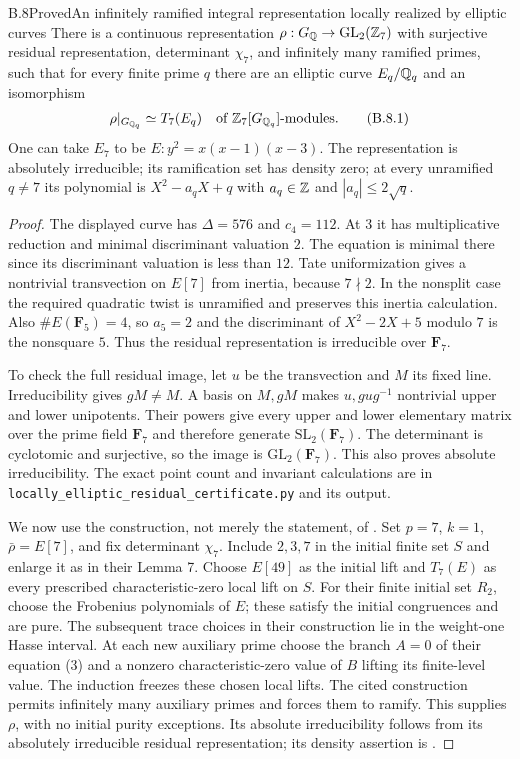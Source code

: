 \begin{statement}{B.8}{Proved}{An infinitely ramified integral representation locally realized by elliptic curves}
There is a continuous representation
$\rho:G_\mathbb Q\to\mathrm{GL}_2(\mathbb Z_7)$ with surjective residual
representation, determinant $\chi_7$, and infinitely many ramified
primes, such that for every finite prime $q$ there are an elliptic
curve $E_q/\mathbb Q_q$ and an isomorphism
\[
 \rho|_{G_{\mathbb Q_q}}\simeq T_7(E_q)
 \quad\text{of }\mathbb Z_7[G_{\mathbb Q_q}]\text{-modules}.      \tag{B.8.1}
\]
One can take $E_7$ to be $E:y^2=x(x-1)(x-3)$.  The representation
is absolutely irreducible; its ramification set has density zero;
at every unramified $q\ne7$ its polynomial is
$X^2-a_qX+q$ with $a_q\in\mathbb Z$ and $|a_q|\le2\sqrt q$.
\end{statement}
\begin{proof}
The displayed curve has $\Delta=576$ and $c_4=112$.  At $3$ it
has multiplicative reduction and minimal discriminant valuation $2$.
The equation is minimal there since its discriminant valuation is
less than $12$.  Tate uniformization gives a nontrivial transvection
on $E[7]$ from inertia, because $7\nmid2$.  In the nonsplit case
the required quadratic twist is unramified and preserves this inertia
calculation.  Also $\#E(\mathbf F_5)=4$, so $a_5=2$ and the
discriminant of $X^2-2X+5$ modulo $7$ is the nonsquare $5$.
Thus the residual representation is irreducible over $\mathbf F_7$.

To check the full residual image, let $u$ be the transvection and
$M$ its fixed line.  Irreducibility gives $gM\ne M$.  A basis on
$M,gM$ makes $u,gug^{-1}$ nontrivial upper and lower unipotents.
Their powers give every upper and lower elementary matrix over the
prime field $\mathbf F_7$ and therefore generate
$\mathrm{SL}_2(\mathbf F_7)$.  The determinant is cyclotomic and
surjective, so the image is $\mathrm{GL}_2(\mathbf F_7)$.
This also proves absolute irreducibility.  The exact point count
and invariant calculations are in
\texttt{locally\_elliptic\_residual\_certificate.py} and its output.

We now use the construction, not merely the statement, of
\cite[\S2.2, Main Theorem and its following remark]{BIR_KLR2005}.
Set $p=7$, $k=1$, $\bar\rho=E[7]$, and fix determinant $\chi_7$.
Include $2,3,7$ in the initial finite set $S$ and enlarge it as in
their Lemma 7.  Choose $E[49]$ as the initial lift and $T_7(E)$
as every prescribed characteristic-zero local lift on $S$.
For their finite initial set $R_2$, choose the Frobenius polynomials
of $E$; these satisfy the initial congruences and are pure.  The
subsequent trace choices in their construction lie in the weight-one
Hasse interval.  At each new auxiliary prime choose the branch
$A=0$ of their equation (3) and a nonzero characteristic-zero value
of $B$ lifting its finite-level value.  The induction freezes these
chosen local lifts.  The cited construction permits infinitely many
auxiliary primes and forces them to ramify.  This supplies $\rho$,
with no initial purity exceptions.  Its absolute irreducibility
follows from its absolutely irreducible residual representation;
its density assertion is \cite[Theorem 1]{BIR_KhareRajan2001}.


\end{proof}
